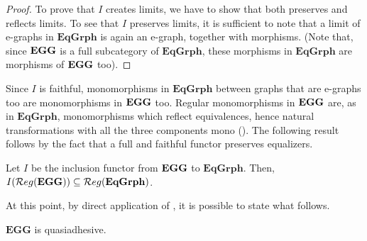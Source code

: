 \begin{proof}
    To prove that $I$ creates limits, we have to show that both preserves and reflects limits.
    To see that $I$ preserves limits, it is sufficient to note that a limit of e-graphs in $\mathbf{EqGrph}$ is again an e-graph, together with morphisms. (Note that, since $\mathbf{EGG}$ is a full subcategory of $\mathbf{EqGrph}$, these morphisms in $\mathbf{EqGrph}$ are morphisms of $\mathbf{EGG}$ too).
\end{proof}

Since $I$ is faithful, monomorphisms in $\mathbf{EqGrph}$ between graphs that are e-graphs too are monomorphisms in $\mathbf{EGG}$ too. Regular monomorphisms in $\mathbf{EGG}$ are, as in $\mathbf{EqGrph}$, monomorphisms which reflect equivalences, hence natural transformations with all the three components mono (). The following result follows by the fact that a full and faithful functor preserves equalizers. {\color{red}{???? Da dimostrare}}

\begin{prop}
    Let $I$ be the inclusion functor from $\mathbf{EGG}$ to $\mathbf{EqGrph}$. Then, $I(\mathcal{R}eg(\mathbf{EGG})) \subseteq \mathcal{R}eg(\mathbf{EqGrph})$.
\end{prop}

At this point, by direct application of , it is possible to state what follows.

\begin{cor}
    $\mathbf{EGG}$ is quasiadhesive.
\end{cor}

